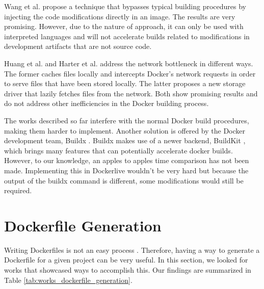 
Wang et al. \cite{wangCodeInjectionMethod2019} propose a technique that bypasses typical building procedures by injecting the code modifications directly in an image. The results are very promising. However, due to the nature of approach, it can only be used with interpreted languages and will not accelerate builds related to modifications in development artifacts that are not source code.

Huang et al. \cite{huangFastBuildAcceleratingDocker2019} and Harter et al. \cite{harterSlackerFastDistribution} address the network bottleneck in different ways. The former caches files locally and intercepts Docker's network requests in order to serve files that have been stored locally. The latter proposes a new storage driver that lazily fetches files from the network. Both show promising results and do not address other inefficiencies in the Docker building process.

The works described so far interfere with the normal Docker build procedures, making them harder to implement. Another solution is offered by the Docker development team, Buildx \cite{DockerBuildx2022}. Buildx makes use of a newer backend, BuildKit \cite{BuildKit2022}, which brings many features that can potentially accelerate docker builds. However, to our knowledge, an apples to apples time comparison has not been made. Implementing this in Dockerlive wouldn't be very hard but because the output of the buildx command is different, some modifications would still be required.

\section{Dockerfile Generation} \label{sec:dockerfile_generation}

Writing Dockerfiles is not an easy process \cite{reisDevelopingDockerDockerCompose2022}. Therefore, having a way to generate a Dockerfile for a given project can be very useful. In this section, we looked for works that showcased ways to accomplish this. Our findings are summarized in Table \ref{tab:works_dockerfile_generation}.


